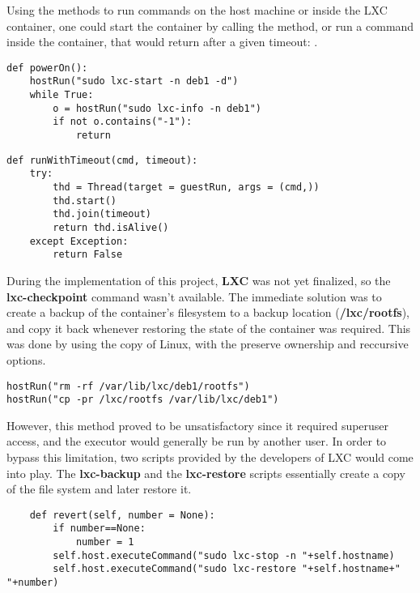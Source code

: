 Using the methods to run commands on the host machine or inside the 
LXC container, one could start the container by calling the 
 method, or run a command inside the container,
that would return after a given timeout: .

\lstset{caption=Method called to power on the container,language=python,label=lst:lxc-poweron}
\begin{lstlisting}
def powerOn():
    hostRun("sudo lxc-start -n deb1 -d")
    while True:
        o = hostRun("sudo lxc-info -n deb1")
        if not o.contains("-1"):
            return
\end{lstlisting}


\lstset{caption=Method that runs a command inside the container,language=python,label=lst:lxc-runtimeout}
\begin{lstlisting}
def runWithTimeout(cmd, timeout):
    try:
        thd = Thread(target = guestRun, args = (cmd,))
        thd.start()
        thd.join(timeout)
        return thd.isAlive()
    except Exception:
        return False
\end{lstlisting}

During the implementation of this project, \textbf{LXC} was not yet finalized,
so the \textbf{lxc-checkpoint} command wasn't available. 
The immediate solution was to create a backup of the container's filesystem to a 
backup location (\textbf{/lxc/rootfs}), and copy it back whenever 
restoring the state of the container was required. This was done by using the
copy  of Linux, with the preserve ownership and
reccursive options.

\lstset{caption=Restoring the contaier to a previous state, language=python, label=lst:lxc-restore}
\begin{lstlisting}
hostRun("rm -rf /var/lib/lxc/deb1/rootfs")
hostRun("cp -pr /lxc/rootfs /var/lib/lxc/deb1")
\end{lstlisting}

However, this method proved to be unsatisfactory since it required superuser access, and
the executor would generally be run by another user. In order to bypass this limitation,
two scripts provided by the developers of LXC would come into play. 
The \textbf{lxc-backup} and the \textbf{lxc-restore} scripts essentially create a
copy of the file system and later restore it.

\lstset{caption=Restoring the container to a previous state, language=python, label=lst:lxc-revert}
\begin{lstlisting}
    def revert(self, number = None):
        if number==None:
            number = 1
        self.host.executeCommand("sudo lxc-stop -n "+self.hostname)
        self.host.executeCommand("sudo lxc-restore "+self.hostname+" "+number)
\end{lstlisting}

